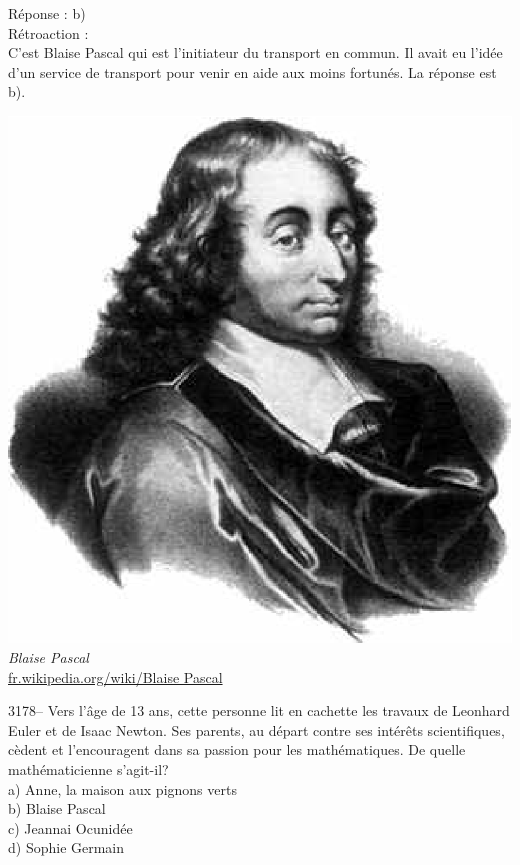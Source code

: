 \documentclass[letterpaper, 12pt]{article}
\begin{document}
R\'eponse : b)\\

R\'etroaction :\\
C'est Blaise Pascal qui est l'initiateur du transport en commun. Il avait eu l'id\'ee d'un service de transport pour venir en aide aux moins fortun\'es. La r\'eponse est b).\\
\begin{center}
\includegraphics[scale=0.3]{Blaise_pascal.eps}\\
\emph{{\small Blaise Pascal}}\\
\href{http://fr.wikipedia.org/wiki/Blaise_Pascal}{fr.wikipedia.org/wiki/Blaise Pascal}\\[5mm]
\end{center}



3178-- Vers l'\^age de 13 ans, cette personne lit en cachette les travaux de Leonhard Euler et de Isaac Newton. Ses parents, au d\'epart contre ses int\'er\^ets scientifiques, c\`edent et l'encouragent dans sa passion pour les math\'ematiques. De quelle math\'ematicienne s'agit-il?\\

a) Anne, la maison aux pignons verts\\
b) Blaise Pascal\\
c) Jeannai Ocunid\'ee\\
d) Sophie Germain\\
\end{document}
